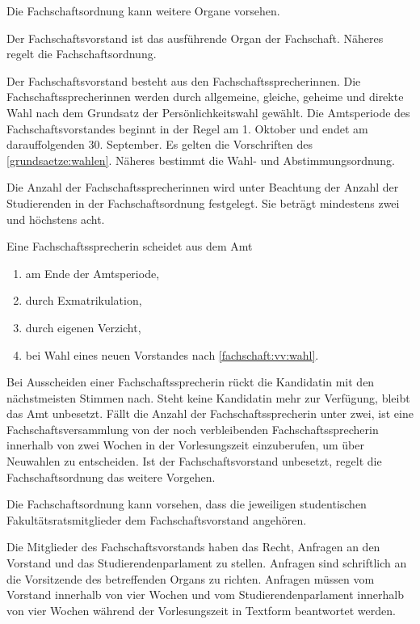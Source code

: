 \begin{jurdoc}
Die Fachschaftsordnung kann weitere Organe vorsehen.


\label{fs:vorstand}

Der Fachschaftsvorstand ist das ausführende Organ der Fachschaft. Näheres regelt die Fachschaftsordnung.

Der Fachschaftsvorstand besteht aus den Fach\-schafts\-sprech\-erinnen. Die Fach\-schafts\-sprech\-erinnen werden durch allgemeine, gleiche, geheime und direkte Wahl nach dem Grundsatz der Persönlichkeitswahl gewählt. Die Amtsperiode des Fachschaftsvorstandes beginnt in der Regel am 1. Oktober und endet am darauffolgenden 30. September. Es gelten die Vorschriften des \ref{grundsaetze:wahlen}. Näheres bestimmt die Wahl- und Abstimmungsordnung.

Die Anzahl der Fachschaftssprecherinnen wird unter Beachtung der Anzahl der Studierenden in der Fachschaftsordnung festgelegt. Sie beträgt mindestens zwei und höchstens acht. \label{fs:vorstand:anzahl}

%
%

Eine Fachschaftssprecherin scheidet aus dem Amt
  \begin{enumerate}
  \item am Ende der Amtsperiode,
  \item durch Exmatrikulation,
  \item durch eigenen Verzicht,
  \item bei Wahl eines neuen Vorstandes nach \ref{fachschaft:vv:wahl}.
\end{enumerate}

Bei Ausscheiden einer Fach\-schafts\-sprecherin rückt die Kandidatin mit den nächstmeisten Stimmen nach. Steht keine Kandidatin mehr zur Verfügung, bleibt das Amt unbesetzt. Fällt die Anzahl der Fach\-schafts\-sprecherin unter zwei, ist eine Fach\-schafts\-versammlung von der noch verbleibenden Fach\-schafts\-sprecherin innerhalb von zwei Wochen in der Vorlesungszeit einzuberufen, um über Neuwahlen zu entscheiden. Ist der Fach\-schafts\-vorstand unbesetzt, regelt die Fach\-schafts\-ordnung das weitere Vorgehen.

Die Fach\-schafts\-ordnung kann vorsehen, dass die jeweiligen studentischen Fakultätsratsmitglieder dem Fachschaftsvorstand angehören.

Die Mitglieder des Fachschaftsvorstands haben das Recht, Anfragen an den  Vorstand und das Studierendenparlament zu stellen. Anfragen sind  schriftlich an die Vorsitzende des betreffenden Organs zu richten.  Anfragen müssen vom Vorstand innerhalb von vier Wochen und vom Studierendenparlament innerhalb von vier Wochen während der Vorlesungszeit in Textform beantwortet werden.


\end{jurdoc}
